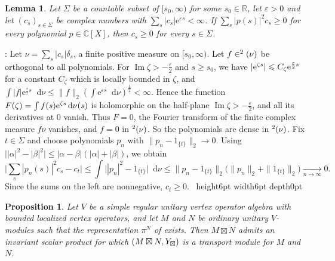 \documentclass[leqno]{article}
\newcommand{\Cbb}{\ensuremath{\mathbb{C}}}
\let\L\relax %
\newcommand{\L}{\mathrm{L}}
\let\cal\relax
\newcommand{\cal}{\mathcal}
\newcommand{\R}{\ensuremath{\mathbb{R}}}
\renewcommand{\leq}{\ensuremath{\leqslant}}
\renewcommand{\geq}{\ensuremath{\geqslant}}
\newcommand{\qed}{\hfill \vrule height6pt  width6pt depth0pt}
\let\i\relax %
\newcommand{\i}{\mathrm{i}}
\newcommand{\epsi}{\varepsilon}
\renewcommand{\d}{\mathop{}\mathopen{}\mathrm{d}} %
\newcommand{\e}{\mathrm{e}} %
\renewcommand{\d}{\mathop{}\mathopen{}\mathrm{d}}
\newtheorem{prop}[thm]{Proposition}
\newtheorem{lemma}[thm]{Lemma}
\newenvironment{proof}[1][]{\noindent {\it Proof #1} : }{\hbox{~}\qed
\smallskip
}
\numberwithin{equation}{section}
\begin{document}
\begin{lemma}
\label{lem:moment-positivity}
Let $\Sigma$ be a countable subset of $[s_0,\infty)$ for some $s_0 \in \R$, let $\epsi > 0$ and let $(c_s)_{s \in \Sigma}$ be complex numbers with $\sum_s |c_s|\e^{\epsi s} < \infty$. If $\sum_s |p(s)|^2c_s \geq 0$ for every polynomial $p \in \Cbb[X]$, then $c_s \geq 0$ for every $s \in \Sigma$.
\end{lemma}

\begin{proof}
Let $\nu = \sum_s |c_s|\delta_s$, a finite positive measure on $[s_0,\infty)$. Let $f \in \L^2(\nu)$ be orthogonal to all polynomials. For $\operatorname{Im}\zeta > -\frac{\epsi}{2}$ and $s \geq s_0$, we have $|\e^{\i\zeta s}| \leq C_\zeta\e^{\frac{\epsi}{2}s}$ for a constant $C_\zeta$ which is locally bounded in $\zeta$, and $\int |f|\e^{\frac{\epsi}{2}s} \d\nu \leq \|f\|_2(\int \e^{\epsi s} \d\nu)^{\frac12} < \infty$. Hence the function $F(\zeta) = \int f(s)\e^{\i\zeta s} \d\nu(s)$ is holomorphic on the half-plane $\operatorname{Im}\zeta > -\frac{\epsi}{2}$, and all its derivatives at $0$ vanish. Thus $F = 0$, the Fourier transform of the finite complex measure $f\nu$ vanishes, and $f = 0$ in $\L^2(\nu)$. So the polynomials are dense in $\L^2(\nu)$. Fix $t \in \Sigma$ and choose polynomials $p_n$ with $\|p_n-1_{\{t\}}\|_2 \to 0$. Using $\big||\alpha|^2-|\beta|^2\big| \leq |\alpha-\beta|(|\alpha|+|\beta|)$, we obtain
\[
\Big|\sum_s |p_n(s)|^2c_s - c_t\Big| \leq \int \big||p_n|^2-1_{\{t\}}\big| \d\nu \leq \|p_n-1_{\{t\}}\|_2\big(\|p_n\|_2+\|1_{\{t\}}\|_2\big) \xrightarrow[n \to \infty]{} 0.
\]
Since the sums on the left are nonnegative, $c_t \geq 0$.
\end{proof}

\begin{prop}
\label{prop:fusion-unitary}
Let $V$ be a simple regular unitary vertex operator algebra with bounded localized vertex operators, and let $M$ and $N$ be ordinary unitary $V$-modules such that the representation $\pi^N$ of \cite[Definition 2.18 p.~20]{Ten24} exists. Then $M \boxtimes N$ admits an invariant scalar product for which $(M \boxtimes N,\cal Y_\boxtimes)$ is a transport module for $M$ and $N$.
\end{prop}
\end{document}
